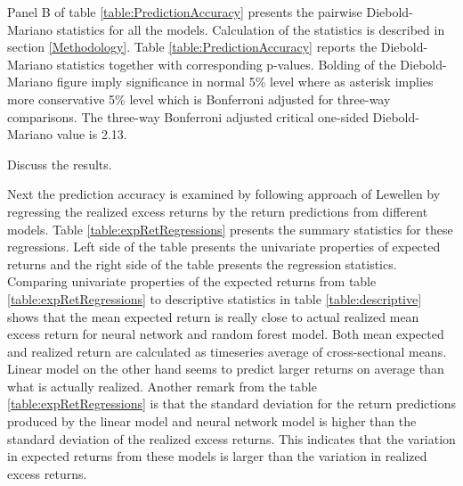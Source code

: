 \documentclass{article}
\begin{document}
Panel B of table \ref{table:PredictionAccuracy} presents the pairwise Diebold-Mariano statistics for all the models. Calculation of the statistics is described in section \ref{Methodology}. Table \ref{table:PredictionAccuracy} reports the Diebold-Mariano statistics together with corresponding p-values. Bolding of the Diebold-Mariano figure imply significance in normal 5\% level where as asterisk implies more conservative 5\% level which is Bonferroni adjusted for three-way comparisons. The three-way Bonferroni adjusted critical one-sided Diebold-Mariano value is 2.13.

Discuss the results.

Next the prediction accuracy is examined by following approach of Lewellen \citeyear{lewellen2015} by regressing the realized excess returns by the return predictions from different models. Table \ref{table:expRetRegressions} presents the summary statistics for these regressions. Left side of the table presents the univariate properties of expected returns and the right side of the table presents the regression statistics. Comparing univariate properties of the expected returns from table \ref{table:expRetRegressions} to descriptive statistics in table \ref{table:descriptive} shows that the mean expected return is really close to actual realized mean excess return for neural network and random forest model. Both mean expected and realized return are calculated as timeseries average of cross-sectional means. Linear model on the other hand seems to predict larger returns on average than what is actually realized. Another remark from the table \ref{table:expRetRegressions} is that the standard deviation for the return predictions produced by the linear model and neural network model is higher than the standard deviation of the realized excess returns. This indicates that the variation in expected returns from these models is larger than the variation in realized excess returns.
\end{document}
